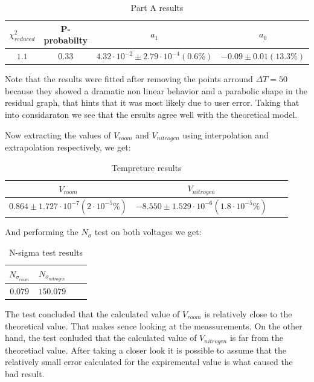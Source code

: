 \documentclass[12pt,a4paper]{report}
\begin{document}
  \begin{table}[htbp]
    \centering
    \label{tab:partA_summary}
    \begin{tabular}{@{}cccc@{}}
      \toprule
      $\chi ^2_{reduced}$ & P-probabilty & $a_1$ & $a_0$ \\
      \midrule
      $1.1$ & $0.33$ & $4.32 \cdot 10^{-2} \pm 2.79 \cdot 10^{-4} (0.6\%)$ & $-0.09 \pm 0.01 (13.3\%)$ \\
      \bottomrule
    \end{tabular}
    \caption{Part A results}
  \end{table}
Note that the results were fitted after removing the points arround  $\Delta T = 50$ because they showed a dramatic non linear behavior and a parabolic shape in the residual graph, that hints that it was most likely due to user error.
Taking that into considaraton we see that the ersults agree well with the theoretical model.

Now extracting the values of $V_{room}$ and $V_{nitrogen}$ using interpolation and extrapolation respectively, we get: 
\begin{table}[htbp]
    \centering
    \label{Part A tempreture results}
    \begin{tabular}{@{}cccc@{}}
      \toprule
       $V_{room}$ & $V_{nitrogen}$ \\
      \midrule
      $0.864 \pm 1.727 \cdot 10^{-7} (2 \cdot 10^{-5} \%)$ & $-8.550 \pm 1.529 \cdot 10^{-6} (1.8 \cdot 10^{-5} \%)$ \\
      \bottomrule
    \end{tabular}
    \caption{Tempreture results}
\end{table}
\pagebreak

And performing the $N_\sigma$ test on both voltages we get:

\begin{table}[htbp]
    \centering
    \label{Part A N-sigma test results}
    \begin{tabular}{@{}cccc@{}}
      \toprule
       $N_{\sigma_{room}} $& $N_{\sigma_{nitrogen}}$ \\
      \midrule
      $0.079$ & $150.079$ \\
      \bottomrule
    \end{tabular}
    \caption{N-sigma test results}

\end{table}
The test concluded that the calculated value of $V_{room}$ is relatively close to the theoretical value. That makes sence looking at the meassurements. 
On the other hand, the test conluded that the calculated value of $V_{nitrogen}$ is far from the theoretiacl value. After taking a closer look it is possible to assume that the relatively small error calculated for the expiremental value is what caused the bad result. 
\end{document}
